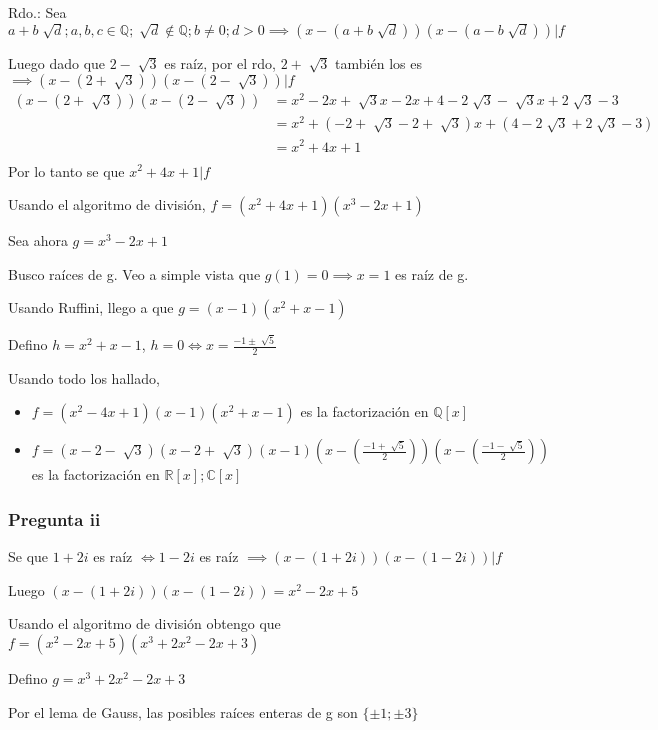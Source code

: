 Rdo.: Sea $ a+b\sqrt[]{d}; a,b,c \in \mathbb{Q}; \sqrt[]{d} \not \in \mathbb{Q}; b \neq 0; d > 0 \implies (x-(a+b\sqrt[]{d}))(x-(a-b\sqrt[]{d})) | f $ 

Luego dado que $ 2-\sqrt[]{3} $ es raíz, por el rdo, $ 2+\sqrt[]{3} $ también los es $ \implies (x-(2+\sqrt[]{3})) (x-(2-\sqrt[]{3}))|f $
\begin{align*}
    (x-(2+\sqrt[]{3})) (x-(2-\sqrt[]{3})) &= x^2 -2x + \sqrt[]{3}x - 2x + 4 - 2\sqrt[]{3} - \sqrt[]{3}x + 2\sqrt[]{3} - 3 \\
    &= x^2 + (-2+\sqrt[]{3} - 2 + \sqrt[]{3})x + (4-2\sqrt[]{3} + 2\sqrt[]{3} - 3) \\
    &= x^2 + 4x + 1 \\
\end{align*}
Por lo tanto se que $ x^2 + 4x + 1 |f $

Usando el algoritmo de división, $ f = (x^2 + 4x + 1)(x^3-2x+1) $

Sea ahora $ g = x^3-2x+1 $

Busco raíces de g. Veo a simple vista que $ g(1) = 0 \implies x = 1 $ es raíz de g.

Usando Ruffini, llego a que $ g = (x-1)(x^2+x-1) $

Defino $ h = x^2+x-1 $, $ h = 0 \iff x = \frac{-1 \pm \sqrt[]{5}}{2} $

Usando todo los hallado,
\begin{itemize}
    \item $ f = (x^2 -4x + 1)(x-1)(x^2 +x -1) $ es la factorización en $ \mathbb{Q}[x] $
    \item $ f = (x-2-\sqrt[]{3})(x-2+\sqrt[]{3})(x-1)(x-(\frac{-1+\sqrt[]{5}}{2}))(x-(\frac{-1-\sqrt[]{5}}{2})) $ es la factorización en $ \mathbb{R}[x]; \mathbb{C}[x] $
\end{itemize}

\subsubsection{Pregunta ii}

Se que $ 1+2i $ es raíz $ \iff 1-2i $ es raíz $ \implies (x-(1+2i))(x-(1-2i)) | f $

Luego $ (x-(1+2i))(x-(1-2i)) = x^2 - 2x+5 $

Usando el algoritmo de división obtengo que $ f = (x^2 - 2x+5)(x^3+2x^2-2x+3) $

Defino $ g = x^3+2x^2-2x+3 $

Por el lema de Gauss, las posibles raíces enteras de g son $  \{ \pm 1; \pm 3 \}$

